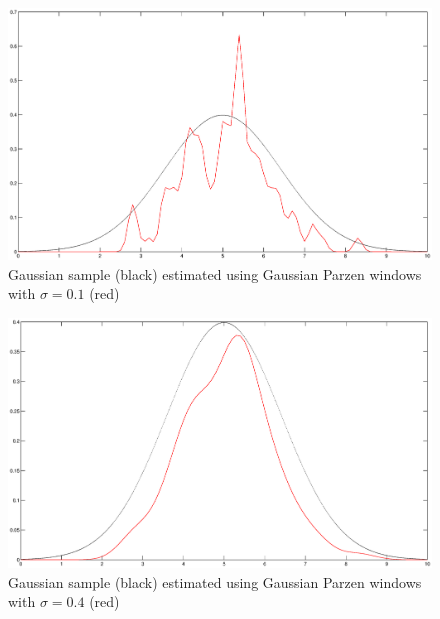 \begin{figure}
\includegraphics[scale=0.4]{nonpar-parzen-01}
\caption{Gaussian sample (black) estimated using Gaussian Parzen windows
with $\sigma=0.1$ (red)}
\label{fig:parzen1}
\end{figure}

\begin{figure}
\includegraphics[scale=0.4]{nonpar-parzen-04}
\caption{Gaussian sample (black) estimated using Gaussian Parzen windows
with $\sigma=0.4$ (red)}
\label{fig:parzen4}
\end{figure}